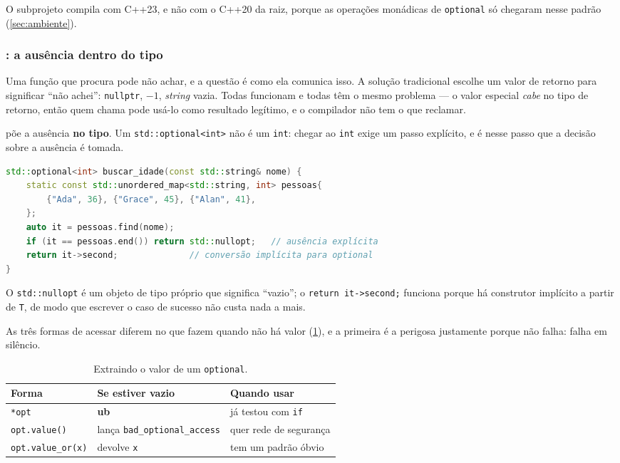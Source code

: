 O subprojeto compila com C++23, e não com o C++20 da raiz, porque as operações
monádicas de \texttt{optional} só chegaram nesse padrão (\cref{sec:ambiente}).

\subsubsection{: a ausência dentro do tipo}

Uma função que procura pode não achar, e a questão é como ela comunica isso. A
solução tradicional escolhe um valor de retorno para significar ``não achei'':
\texttt{nullptr}, $-1$, \emph{string} vazia. Todas funcionam e todas têm o mesmo
problema --- o valor especial \emph{cabe} no tipo de retorno, então quem chama
pode usá-lo como resultado legítimo, e o compilador não tem o que reclamar.

 põe a ausência \textbf{no tipo}. Um
\texttt{std::optional<int>} não é um \texttt{int}: chegar ao \texttt{int} exige
um passo explícito, e é nesse passo que a decisão sobre a ausência é tomada.

\begin{lstlisting}[style=bt, language=C++,
    caption={A ausência declarada na assinatura, em
             \texttt{src/vocabulary\_types/demo\_optional.hpp}.}]
std::optional<int> buscar_idade(const std::string& nome) {
    static const std::unordered_map<std::string, int> pessoas{
        {"Ada", 36}, {"Grace", 45}, {"Alan", 41},
    };
    auto it = pessoas.find(nome);
    if (it == pessoas.end()) return std::nullopt;   // ausência explícita
    return it->second;              // conversão implícita para optional
}
\end{lstlisting}

O \texttt{std::nullopt} é um objeto de tipo próprio que significa ``vazio''; o
\texttt{return it->second;} funciona porque há construtor implícito a partir de
\texttt{T}, de modo que escrever o caso de sucesso não custa nada a mais.

As três formas de acessar diferem no que fazem quando não há valor
(\cref{tab:optional-formas}), e a primeira é a perigosa justamente porque não
falha: falha em silêncio.

\begin{table}[htbp]
\centering
\caption{Extraindo o valor de um \texttt{optional}.}
\label{tab:optional-formas}
\footnotesize
\begin{tabular}{@{}lll@{}}
\toprule
\textbf{Forma} & \textbf{Se estiver vazio} & \textbf{Quando usar} \\
\midrule
\texttt{*opt}             & \textbf{\gls{ub}}                    & já testou com \texttt{if} \\
\texttt{opt.value()}      & lança \texttt{bad\_optional\_access} & quer rede de segurança \\
\texttt{opt.value\_or(x)} & devolve \texttt{x}                   & tem um padrão óbvio \\
\bottomrule
\end{tabular}
\end{table}

